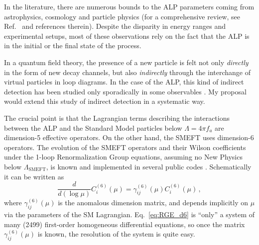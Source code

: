 \documentclass[12pt, a4paper]{article}
\begin{document}
In the literature, there are numerous bounds to the ALP parameters coming from astrophysics, cosmology \cite{Cadamuro:2011fd,Millea:2015qra,DiLuzio:2016sbl,Agrawal:2021dbo,Lucente:2021hbp} and particle physics \cite{Mimasu:2014nea,Jaeckel:2015jla,Bauer:2017ris,Brivio:2017ije,Alonso-Alvarez:2018irt,Baldenegro:2018hng,
Harland-Lang:2019zur,MartinCamalich:2020dfe,DiLuzio:2020oah,Guerrera:2021yss,Gallo:2021ame} (for a comprehensive review, see Ref.~\cite{Irastorza:2018dyq} 
and references therein). Despite the disparity in energy ranges and experimental setups, most of these observations rely on the fact that the ALP is in the initial or the final state of the process.

In a quantum field theory, the presence of a new particle is felt not only \textit{directly} in the form of new decay channels, but also \textit{indirectly} through the interchange of virtual particles in loop diagrams. In the case of the ALP, this kind of indirect detection has been studied only sporadically in some observables \cite{Bauer:2017nlg,Bauer:2017ris,Marciano:2016yhf,Bauer:2019gfk,Buen-Abad:2021fwq}. My proposal would extend this study of indirect detection in a systematic way.

The crucial point is that the Lagrangian terms describing the interactions between the ALP and the Standard Model particles below $\Lambda = 4\pi f_a$ are dimension-5 effective operators. On the other hand, the SMEFT uses dimension-6 operators. The evolution of the SMEFT operators and their Wilson coefficients under the 1-loop Renormalization Group equations, assuming no New Physics below $\Lambda_\mathrm{SMEFT}$, is known \cite{Jenkins:2013zja,Jenkins:2013wua,Alonso:2013hga,} and implemented in several public codes \cite{Celis:2017hod,Aebischer:2018bkb}. Schematically it can be written as
\begin{equation}
\frac{d}{d(\log \mu)}C^{(6)}_i(\mu) = \gamma^{(6)}_{ij}(\mu)C^{(6)}_i(\mu)\,,\label{eq:RGE_d6}
\end{equation}
where $\gamma^{(6)}_{ij}(\mu)$ is the anomalous dimension matrix, and depends implicitly on $\mu$ via the parameters of the SM Lagrangian. Eq.~\eqref{eq:RGE_d6} is ``only'' a system of many (2499) first-order homogeneous differential equations, so once the matrix $\gamma^{(6)}_{ij}(\mu)$ is known, the resolution of the system is quite easy.
\end{document}
